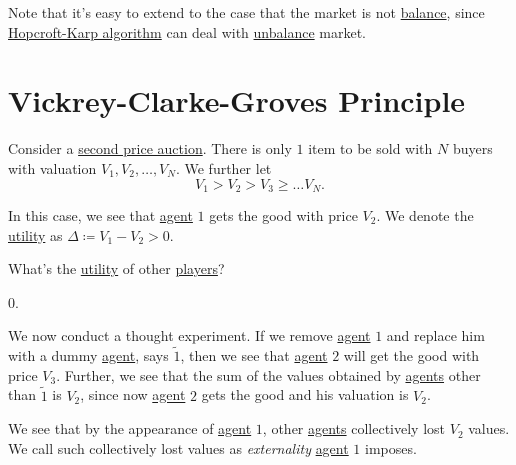 \begin{note}
	Note that it's easy to extend to the case that the market is not \hyperref[def:balance]{balance}, since \hyperref[algo:Hopcroft-Karp-algorithm]{Hopcroft-Karp algorithm} can deal with \hyperref[def:balance]{unbalance} market.
\end{note}

\section{Vickrey-Clarke-Groves Principle}
Consider a \hyperref[eg:second-price-auction]{second price auction}. There is only \(1\) item to be sold with \(N\) buyers with valuation \(V_{1}, V_{2}, \ldots , V_{N}\). We further let
\[
	V_{1}>V_{2}>V_{3}\geq \ldots V_{N}.
\]

In this case, we see that \hyperref[def:player]{agent} \(1\) gets the good with price \(V_{2}\). We denote the \hyperref[def:reward]{utility} as \(\Delta\coloneqq V_{1}-V_{2}>0\).

\begin{problem}
What's the \hyperref[def:reward]{utility} of other \hyperref[def:player]{players}?
\end{problem}
\begin{answer}
	\(0\).
\end{answer}

We now conduct a thought experiment. If we remove \hyperref[def:player]{agent} \(1\) and replace him with a dummy \hyperref[def:player]{agent}, says \(\tilde{1}\), then we see that \hyperref[def:player]{agent} \(2\) will get the good with price \(V_{3}\). Further, we see that the sum of the values obtained by \hyperref[def:player]{agents} other than \(\tilde{1}\) is \(V_{2}\), since now \hyperref[def:player]{agent} \(2\) gets the good and his valuation is \(V_{2}\).

We see that by the appearance of \hyperref[def:player]{agent} \(1\), other \hyperref[def:player]{agents} collectively lost \(V_{2}\) values. We call such collectively lost values as \emph{externality} \hyperref[def:player]{agent} \(1\) imposes.

